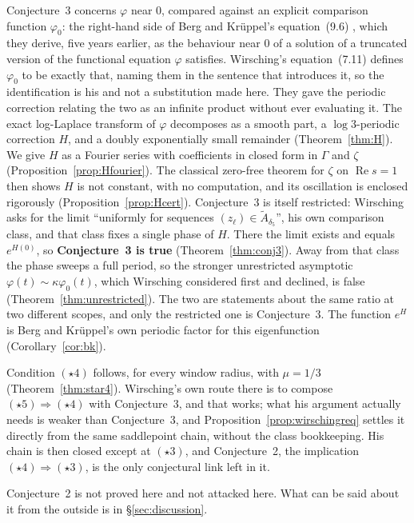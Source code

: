 \documentclass[11pt]{article}
\theoremstyle{definition}
\theoremstyle{remark}
\begin{document}
Conjecture~3 concerns $\varphi$ near $0$, compared against an explicit
comparison function $\varphi_0$: the right-hand side of Berg and
Kr\"uppel's equation~(9.6) \cite{BergKruppel1998}, which they derive,
five years earlier, as the behaviour near $0$ of a solution of a
truncated version of the functional equation $\varphi$ satisfies.
Wirsching's equation~(7.11) defines $\varphi_0$ to be exactly that,
naming them in the sentence that introduces it, so the identification
is his and not a substitution made here. They gave the periodic
correction relating the two as an infinite product without ever
evaluating it. The exact log-Laplace transform of $\varphi$ decomposes
as a smooth part, a $\log3$-periodic correction $H$, and a doubly
exponentially small remainder (Theorem~\ref{thm:H}). We give $H$ as a
Fourier series with coefficients in closed form in $\Gamma$ and $\zeta$
(Proposition~\ref{prop:Hfourier}). The classical zero-free theorem for
$\zeta$ on $\operatorname{Re}s=1$ then shows $H$ is not constant, with
no computation, and its oscillation is enclosed rigorously
(Proposition~\ref{prop:Hcert}). Conjecture~3 is itself restricted: Wirsching asks for the limit
``uniformly for sequences $(z_\ell)\in\widetilde A_{\delta_5}$'', his
own comparison class, and that class fixes a single phase of $H$.
There the limit exists and equals $e^{H(0)}$, so \textbf{Conjecture~3
is true} (Theorem~\ref{thm:conj3}). Away from that class the phase
sweeps a full period, so the stronger unrestricted asymptotic
$\varphi(t)\sim\kappa\varphi_0(t)$, which Wirsching considered first
and declined, is false (Theorem~\ref{thm:unrestricted}). The two are
statements about the same ratio at two different scopes, and only the
restricted one is Conjecture~3. The function $e^H$ is Berg and
Kr\"uppel's own periodic factor for this eigenfunction
(Corollary~\ref{cor:bk}).

Condition $(\star4)$ follows, for every window radius, with $\mu=1/3$
(Theorem~\ref{thm:star4}). Wirsching's own route there is to compose
$(\star5)\Rightarrow(\star4)$ with Conjecture~3, and that works; what
his argument actually needs is weaker than Conjecture~3, and
Proposition~\ref{prop:wirschingreq} settles it directly from the same
saddlepoint chain, without the class bookkeeping. His chain is then
closed except at $(\star3)$, and Conjecture~2, the implication
$(\star4)\Rightarrow(\star3)$, is the only conjectural link left in it.

Conjecture~2 is not proved here and not attacked here. What can be said
about it from the outside is in \S\ref{sec:discussion}.
\end{document}
